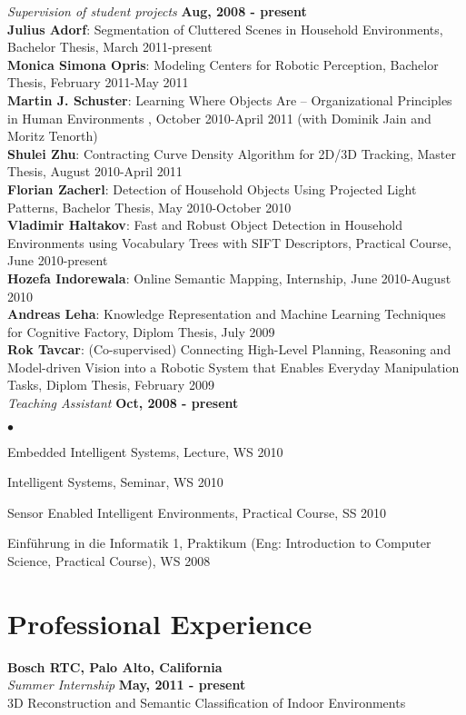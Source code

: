 \documentclass[margin,line]{res}
\newenvironment{list2}{
  \begin{list}{$\bullet$}{%
      \setlength{\itemsep}{0in}
      \setlength{\parsep}{0in} \setlength{\parskip}{0in}
      \setlength{\topsep}{0in} \setlength{\partopsep}{0in} 
      \setlength{\leftmargin}{0.2in}}}{\end{list}}
\begin{document}
\begin{resume}
{\em Supervision of student projects} \hfill {\bf Aug, 2008  - present} \\
\textbf{Julius Adorf}: Segmentation of Cluttered Scenes in Household Environments, Bachelor Thesis, March 2011-present\\
\textbf{Monica Simona Opris}: Modeling Centers for Robotic Perception, Bachelor Thesis, February 2011-May 2011\\
\textbf{Martin J. Schuster}: Learning Where Objects Are – Organizational Principles in Human Environments , October 2010-April 2011 (with Dominik Jain and Moritz Tenorth)\\
\textbf{Shulei Zhu}: Contracting Curve Density Algorithm for 2D/3D Tracking, Master Thesis, August 2010-April 2011\\
\textbf{Florian Zacherl}: Detection of Household Objects Using Projected Light Patterns, Bachelor Thesis, May 2010-October 2010\\
\textbf{Vladimir Haltakov}: Fast and Robust Object Detection in Household Environments using Vocabulary Trees with SIFT Descriptors, 
Practical Course, June 2010-present\\
\textbf{Hozefa Indorewala}: Online Semantic Mapping, Internship, June 2010-August 2010\\
\textbf{Andreas Leha}: Knowledge Representation and Machine Learning Techniques 
for Cognitive Factory, Diplom Thesis, July 2009\\
\textbf{Rok Tavcar}: (Co-supervised) Connecting High-Level Planning, Reasoning and 
Model-driven Vision into a Robotic System that Enables Everyday Manipulation Tasks,
Diplom Thesis, February 2009\\
{\em Teaching Assistant} \hfill {\bf Oct, 2008  - present}\\
\begin{list2}
\item Embedded Intelligent Systems, Lecture, WS 2010
\item Intelligent Systems, Seminar, WS 2010
\item Sensor Enabled Intelligent Environments, Practical Course, SS 2010
\item Einf\"uhrung in die Informatik 1, Praktikum (Eng: 
Introduction to Computer Science, Practical Course), WS 2008
\end{list2}

\section{\sc Professional Experience}
{\bf Bosch RTC, Palo Alto, California}\\
{\em Summer Internship} \hfill {\bf May, 2011 - present}\\
3D Reconstruction and Semantic Classification of Indoor Environments


\end{resume}
\end{document}
